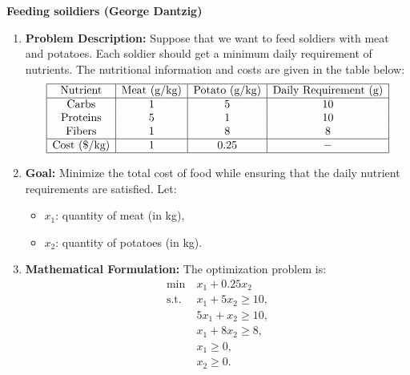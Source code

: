 \begin{example} \textbf{Feeding soildiers (George Dantzig)}
    \begin{enumerate}
        \item \textbf{Problem Description:}  
        Suppose that we want to feed soldiers with meat and potatoes. Each soldier should get a minimum daily requirement of nutrients. The nutritional information and costs are given in the table below:
        \[
        \begin{array}{|c|c|c|c|}
        \hline
        \text{Nutrient} & \text{Meat (g/kg)} & \text{Potato (g/kg)} & \text{Daily Requirement (g)} \\
        \hline
        \text{Carbs} & 1 & 5 & 10 \\
        \text{Proteins} & 5 & 1 & 10 \\
        \text{Fibers} & 1 & 8 & 8 \\
        \hline
        \text{Cost (\$/kg)} & 1 & 0.25 & - \\
        \hline
        \end{array}
        \]
    
        \item \textbf{Goal:}  
        Minimize the total cost of food while ensuring that the daily nutrient requirements are satisfied. Let:
        \begin{itemize}
            \item \(x_1\): quantity of meat (in kg),
            \item \(x_2\): quantity of potatoes (in kg).
        \end{itemize}
    
        \item \textbf{Mathematical Formulation:}  
        The optimization problem is:
        \[
        \begin{aligned}
            \min \ & x_1 + 0.25 x_2 \\
            \text{s.t.} \ & x_1 + 5x_2 \geq 10, \\
            & 5x_1 + x_2 \geq 10, \\
            & x_1 + 8x_2 \geq 8, \\
            & x_1 \geq 0, \\
            & x_2 \geq 0.
        \end{aligned}
        \]
    

\end{enumerate}
\end{example}
